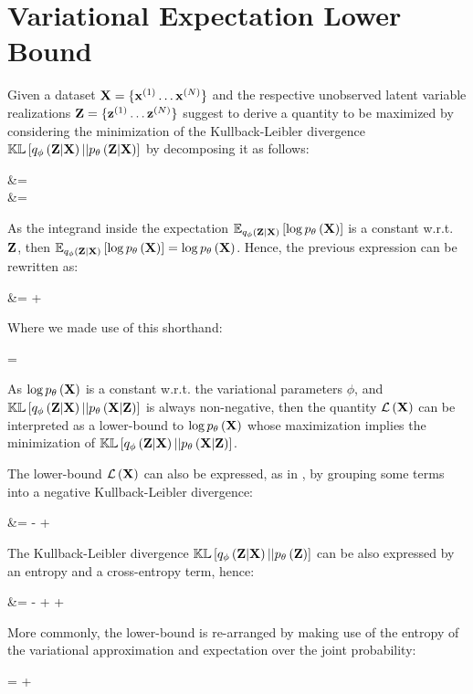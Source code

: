 \section{Variational Expectation Lower Bound}

Given a 
dataset $\mathbf{X} = \{{\mathbf{x}^{(1)}} \ldots {\mathbf{x}^{(N)}} \}$
and the respective unobserved latent variable realizations
$\mathbf{Z} = \{{\mathbf{z}^{(1)}} \ldots {\mathbf{z}^{(N)}}\}$
\cite{Fox2012}
suggest to derive a quantity to be maximized by considering the minimization
of the Kullback-Leibler divergence $\mathbb{KL}\left[ q_\phi\left(\mathbf{Z}|\mathbf{X}\right) || p_\theta\left(\mathbf{Z}|\mathbf{X}\right) \right]$ by decomposing it as follows:

\begin{nalign}
\kl{\qphiZ}{\pZcond} &=
\expectqphiZ{\log \frac{\qphiZ}{\pZcond}}\\
&= \expectqphiZ{\log \qphiZ - \log \pXcond - \log \pZ + \log \pX}
\end{nalign}

As the integrand inside the expectation $\mathbb{E}_{q_\phi\left(\mathbf{Z}|\mathbf{X}\right)}\left[ \log p_\theta\left(\mathbf{X}\right) \right]$ 
is a constant w.r.t. $\mathbf{Z}$, then $\mathbb{E}_{q_\phi\left(\mathbf{Z}|\mathbf{X}\right)}\left[ \log p_\theta\left(\mathbf{X}\right) \right]=\log p_\theta\left(\mathbf{X}\right)$. Hence, the
previous expression can be rewritten as:

\begin{nalign}
\log \pX &= \kl{\qphiZ}{\pXcond}
+ \elboX
\end{nalign}

Where we made use of this shorthand:
\begin{nalign}
    \elboX = \expectqphiZ{-\log \qphiZ + \log \pXcond + \log \pZ}
\end{nalign}

As $\log p_\theta\left(\mathbf{X}\right)$ is a constant w.r.t. the variational parameters $\phi$,
and $\mathbb{KL}\left[ q_\phi\left(\mathbf{Z}|\mathbf{X}\right) || p_\theta\left(\mathbf{X}|\mathbf{Z}\right) \right]$ is always non-negative,
then the quantity $\mathcal{L}\left(\mathbf{X}\right)$ can be interpreted as a lower-bound to $\log p_\theta\left(\mathbf{X}\right)$
whose maximization implies the minimization of $\mathbb{KL}\left[ q_\phi\left(\mathbf{Z}|\mathbf{X}\right) || p_\theta\left(\mathbf{X}|\mathbf{Z}\right) \right]$.

The lower-bound $\mathcal{L}\left(\mathbf{X}\right)$ can also be expressed, as in \cite{1312.6114},
by grouping some terms
into a negative Kullback-Leibler divergence:
\begin{nalign}
\elboX 
&= -\kl{\qphiZ}{\pZ} + \expectqphiZ{\log \pXcond}
\end{nalign}

The Kullback-Leibler divergence $\mathbb{KL}\left[ q_\phi\left(\mathbf{Z}|\mathbf{X}\right) || p_\theta\left(\mathbf{Z}\right) \right]$ can be also expressed by 
an entropy and a cross-entropy term, hence:

\begin{nalign}\label{elbo_crossentropy}
\elboX 
&= -\entropy{\qphiZ,\pZ} + \entropy{\qphiZ} + \expectqphiZ{\log \pXcond}
\end{nalign}

More commonly, the lower-bound is re-arranged by making use of
the entropy of the variational approximation
and expectation over the joint probability:

\begin{nalign}
\elboX = \entropy{\qphiZ} + \expectqphiZ{\log \pXZ}
\end{nalign}



